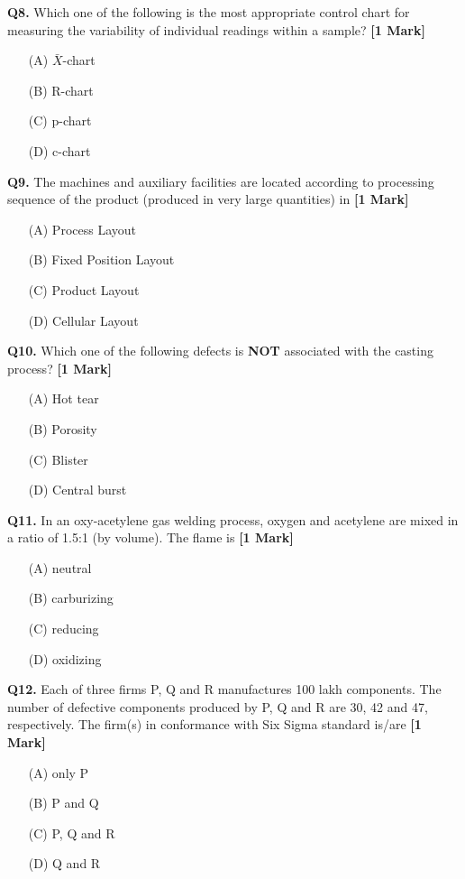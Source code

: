 \documentclass[11pt]{article}
\newcommand{\questiona}[2]{
    \noindent\textbf{Q#2.} #1 \hfill \textbf{[1 Mark]}
}
\begin{document}
\questiona{Which one of the following is the most appropriate control chart for measuring the variability of individual readings within a sample?}{8}
\begin{enumerate}
    \item[(A)] \( \bar{X} \)-chart
    \item[(B)] R-chart
    \item[(C)] p-chart
    \item[(D)] c-chart
\end{enumerate}
\vspace{0.5cm}

\questiona{The machines and auxiliary facilities are located according to processing sequence of the product (produced in very large quantities) in}{9}
\begin{enumerate}
    \item[(A)] Process Layout
    \item[(B)] Fixed Position Layout
    \item[(C)] Product Layout
    \item[(D)] Cellular Layout
\end{enumerate}
\vspace{0.5cm}

\questiona{Which one of the following defects is \textbf{NOT} associated with the casting process?}{10}
\begin{enumerate}
    \item[(A)] Hot tear
    \item[(B)] Porosity
    \item[(C)] Blister
    \item[(D)] Central burst
\end{enumerate}
\vspace{0.5cm}

\questiona{In an oxy-acetylene gas welding process, oxygen and acetylene are mixed in a ratio of 1.5:1 (by volume). The flame is}{11}
\begin{enumerate}
    \item[(A)] neutral
    \item[(B)] carburizing
    \item[(C)] reducing
    \item[(D)] oxidizing
\end{enumerate}
\vspace{0.5cm}

\questiona{Each of three firms P, Q and R manufactures 100 lakh components. The number of defective components produced by P, Q and R are 30, 42 and 47, respectively. The firm(s) in conformance with Six Sigma standard is/are}{12}
\begin{enumerate}
    \item[(A)] only P
    \item[(B)] P and Q
    \item[(C)] P, Q and R
    \item[(D)] Q and R
\end{enumerate}
\vspace{0.5cm}
\end{document}
